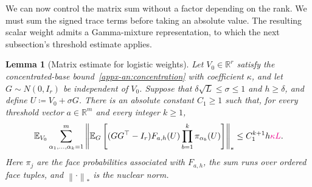 \documentclass[11pt,letterpaper]{article}
\newcommand{\vSix}[1]{{\color{magenta}#1}}
\newtheorem{lemma}{Lemma}
\theoremstyle{remark}
\newcommand{\E}{\mathbb E}
\newcommand{\R}{\mathbb R}
\newcommand{\norm}[1]{\left\lVert#1\right\rVert}
\begin{document}
We can now control the matrix sum without a factor depending on the
rank. We must sum the signed trace terms before taking an absolute value.
The resulting scalar weight admits a Gamma-mixture representation,
to which the next subsection's threshold estimate applies.

\begin{lemma}[Matrix estimate for logistic weights]
\label{appx-an:lem:matrix}
Let \(V_0\in\R^r\) satisfy the concentrated-base
bound~\eqref{appx-an:concentration}\vSix{ with coefficient \(\kappa\)}, and let \(G\sim N(0,I_r)\) be
independent of \(V_0\). Suppose that
\(\delta\sqrt L\le\sigma\le1\) and \(h\ge\delta\), and {define}
\(U\coloneqq V_0+\sigma G\). There is an absolute constant
\(C_1\ge1\) such that, for every threshold vector \(a\in\R^m\)
and every integer \(k\ge1\),
\begin{equation}
 \E_{V_0}\sum_{\alpha_1,\ldots,\alpha_k=1}^m
 \left\|\E_G\left[(GG^\top-I_r)F_{a,h}(U)
              \prod_{b=1}^k\pi_{\alpha_b}(U)\right]\right\|_*
 \le C_1^{k+1}h\vSix{\kappa L}.
 \label{appx-an:matrix-bound}
\end{equation}
Here \(\pi_j\) are the face probabilities associated with
\(F_{a,h}\), the sum runs over ordered face tuples, and
\(\norm{\cdot}_*\) is the nuclear norm.
\end{lemma}
\end{document}
